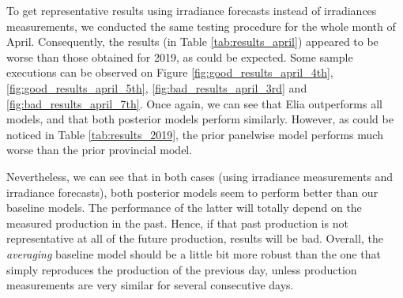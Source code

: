 \documentclass[a4paper, 12pt]{article}
\begin{document}
To get representative results using irradiance forecasts instead of irradiances measurements, we conducted the same testing procedure for the whole month of April. Consequently, the results (in Table \ref{tab:results_april}) appeared to be worse than those obtained for 2019, as could be expected. Some sample executions can be observed on Figure \ref{fig:good_results_april_4th}, \ref{fig:good_results_april_5th}, \ref{fig:bad_results_april_3rd} and \ref{fig:bad_results_april_7th}. Once again, we can see that Elia outperforms all models, and that both posterior models perform similarly. However, as could be noticed in Table \ref{tab:results_2019}, the prior panelwise model performs much worse than the prior provincial model.

Nevertheless, we can see that in both cases (using irradiance measurements and irradiance forecasts), both posterior models seem to perform better than our baseline models. The performance of the latter will totally depend on the measured production in the past. Hence, if that past production is not representative at all of the future production, results will be bad. Overall, the \emph{averaging} baseline model should be a little bit more robust than the one that simply reproduces the production of the previous day, unless production measurements are very similar for several consecutive days.
\end{document}
